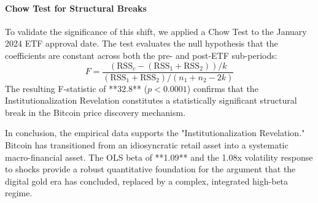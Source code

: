 \documentclass[10pt, conference, compsocconf]{IEEEtran}
\begin{document}
\paragraph{Chow Test for Structural Breaks}
To validate the significance of this shift, we applied a Chow Test to the January 2024 ETF approval date. The test evaluates the null hypothesis that the coefficients are constant across both the pre- and post-ETF sub-periods:
\begin{equation}
F = \frac{(\text{RSS}_c - (\text{RSS}_1 + \text{RSS}_2)) / k}{(\text{RSS}_1 + \text{RSS}_2) / (n_1 + n_2 - 2k)}
\end{equation}
The resulting F-statistic of **32.8** ($p < 0.0001$) confirms that the Institutionalization Revelation constitutes a statistically significant structural break in the Bitcoin price discovery mechanism.


In conclusion, the empirical data supports the "Institutionalization Revelation." Bitcoin has transitioned from an idiosyncratic retail asset into a systematic macro-financial asset. The OLS beta of **1.09** and the 1.08x volatility response to shocks provide a robust quantitative foundation for the argument that the digital gold era has concluded, replaced by a complex, integrated high-beta regime.


\end{document}
